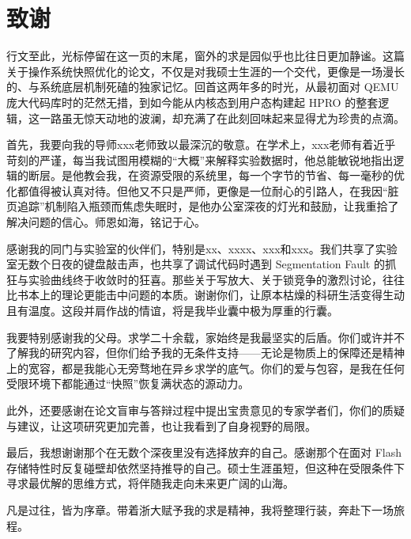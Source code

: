 \chapter{致\ZJUspace{}谢}


行文至此，光标停留在这一页的末尾，窗外的求是园似乎也比往日更加静谧。这篇关于操作系统快照优化的论文，不仅是对我硕士生涯的一个交代，更像是一场漫长的、与系统底层机制死磕的独家记忆。回首这两年多的时光，从最初面对 QEMU 庞大代码库时的茫然无措，到如今能从内核态到用户态构建起 HPRO 的整套逻辑，这一路虽无惊天动地的波澜，却充满了在此刻回味起来显得尤为珍贵的点滴。

首先，我要向我的导师xxx老师致以最深沉的敬意。在学术上，xxx老师有着近乎苛刻的严谨，每当我试图用模糊的“大概”来解释实验数据时，他总能敏锐地指出逻辑的断层。是他教会我，在资源受限的系统里，每一个字节的节省、每一毫秒的优化都值得被认真对待。但他又不只是严师，更像是一位耐心的引路人，在我因“脏页追踪”机制陷入瓶颈而焦虑失眠时，是他办公室深夜的灯光和鼓励，让我重拾了解决问题的信心。师恩如海，铭记于心。

感谢我的同门与实验室的伙伴们，特别是xx、xxxx、xxx和xxx。我们共享了实验室无数个日夜的键盘敲击声，也共享了调试代码时遇到 Segmentation Fault 的抓狂与实验曲线终于收敛时的狂喜。那些关于写放大、关于锁竞争的激烈讨论，往往比书本上的理论更能击中问题的本质。谢谢你们，让原本枯燥的科研生活变得生动且有温度。这段并肩作战的情谊，将是我毕业囊中极为厚重的行囊。

我要特别感谢我的父母。求学二十余载，家始终是我最坚实的后盾。你们或许并不了解我的研究内容，但你们给予我的无条件支持——无论是物质上的保障还是精神上的宽容，都是我能心无旁骛地在异乡求学的底气。你们的爱与包容，是我在任何受限环境下都能通过“快照”恢复满状态的源动力。

此外，还要感谢在论文盲审与答辩过程中提出宝贵意见的专家学者们，你们的质疑与建议，让这项研究更加完善，也让我看到了自身视野的局限。

最后，我想谢谢那个在无数个深夜里没有选择放弃的自己。感谢那个在面对 Flash 存储特性时反复碰壁却依然坚持推导的自己。硕士生涯虽短，但这种在受限条件下寻求最优解的思维方式，将伴随我走向未来更广阔的山海。

凡是过往，皆为序章。带着浙大赋予我的求是精神，我将整理行装，奔赴下一场旅程。
